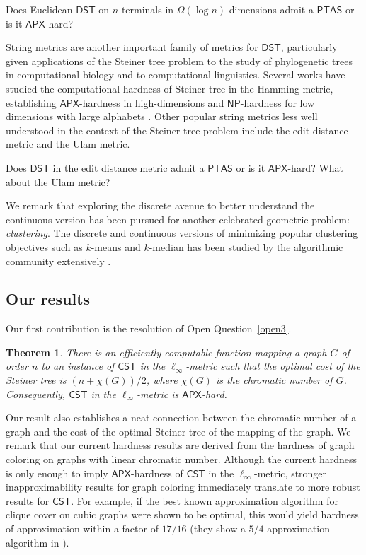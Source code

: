 \documentclass{article}\providecommand{\DeclareRedundantLanguages}[2]{}\usepackage[a4paper,margin=20mm]{geometry}
\newtheorem{theorem}{Theorem}\newtheorem{lemma}[theorem]{Lemma}\newtheorem{proposition}[theorem]{Proposition}\newtheorem{corollary}[theorem]{Corollary}\newtheorem{definition}[theorem]{Definition}\newtheorem{claim}[theorem]{Claim}\newtheorem{remark}[theorem]{Remark}\newtheorem{observation}[theorem]{Observation}\newtheorem{conjecture}[theorem]{Conjecture}\newtheorem{example}[theorem]{Example}
\newcommand{\1}{\textbf{1}}
\newcommand{\cst}{$\mathsf{CST}$\xspace}
\newcommand{\dst}{$\mathsf{DST}$\xspace}
\newcommand{\np}{$\mathsf{NP}$\xspace}
\newcommand{\apx}{$\mathsf{APX}$\xspace}
\newcommand{\ptas}{$\mathsf{PTAS}$\xspace}
\begin{document}
\begin{openq}\label{open4}
Does Euclidean \dst on $n$ terminals in $\Omega(\log n)$ dimensions admit a \ptas or is it \apx-hard?\end{openq}

String metrics are another important family of metrics for \dst, particularly given applications of the Steiner tree problem to the study of phylogenetic trees in computational biology and to computational linguistics. Several works have studied the computational hardness of Steiner tree in the Hamming metric, establishing \apx-hardness in high-dimensions and \np-hardness for low dimensions with large alphabets \cite{Wareham_1995, althaus2013low, sankoff1975minimal, foulds1982steiner, fernandez1998approximability}.  Other popular string metrics less well understood in the context of the Steiner tree problem include the edit distance metric \cite{lev1966binary} and the Ulam metric.
\begin{openq}\label{open5}
Does \dst in the edit distance metric admit a \ptas or is it \apx-hard? What about the Ulam metric?
\end{openq}

We remark that exploring the discrete avenue to better understand the continuous version has been pursued for another celebrated geometric problem: \emph{clustering}. The discrete and continuous versions of minimizing popular clustering objectives such as $k$-means and $k$-median has been studied by the algorithmic community extensively \cite{byrka2017improved,DBLP:journals/siamcomp/AhmadianNSW20,CNS22,CK19,CKL22}.




\subsection{Our results}\label{sec:results}

Our first contribution is the resolution of Open Question~\ref{open3}. 


\begin{theorem} \label{thm:introellinf}
There is an efficiently computable function mapping a graph $G$ of order $n$ to an instance of \cst in the $\ell_{\infty}$-metric such that the optimal cost of the Steiner tree is $(n + \chi(G))/2$, where $\chi(G)$ is the chromatic number of $G$. Consequently, \cst in the $\ell_{\infty}$-metric is \apx-hard.
\end{theorem}


Our result also establishes a neat connection between the chromatic number of a graph and the cost of the optimal Steiner tree of the mapping of the graph. We remark that our current hardness results are derived from the hardness of graph coloring on graphs with linear chromatic number. Although the current hardness is only enough to imply \apx-hardness of \cst in the $\ell_{\infty}$-metric, stronger inapproximability results for graph coloring immediately translate to more robust results for \cst. For example, if the best known approximation algorithm for clique cover on cubic graphs were shown to be optimal, this would yield hardness of approximation within a factor of $17/16$ (they show a $5/4$-approximation algorithm in \cite{Cerioli_Faria_Ferreira_Martinhon_Protti_Reed_2008}). 
\end{document}
